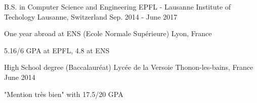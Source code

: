 


\begin{cventries}


\cventry
{B.S. in Computer Science and Engineering} %
{EPFL - Lausanne Institute of Techology} %
{Lausanne, Switzerland} %
{Sep. 2014 - June 2017} %
{ %
\begin{cvitems}
\item {One year abroad at ENS (Ecole Normale Supérieure) Lyon, France}
\item {5.16/6 GPA at EPFL, 4.8 at ENS}
\end{cvitems}
}


\cventry
{High School degree (Baccalauréat)} %
{Lycée de la Versoie} %
{Thonon-les-bains, France} %
{June 2014} %
{ %
	\begin{cvitems}
		\item {"Mention très bien" with 17.5/20 GPA}
	\end{cvitems}
}


\end{cventries}
